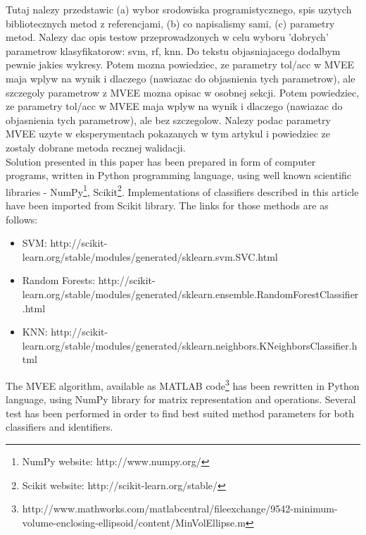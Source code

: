 \documentclass{llncs}
\begin{document}
{\color{red}Tutaj nalezy przedstawic (a) wybor srodowiska programistycznego, spis uzytych bibliotecznych metod z referencjami, (b) co napisalismy sami, (c) parametry metod. Nalezy dac opis testow przeprowadzonych w celu wyboru 'dobrych' parametrow klasyfikatorow: svm, rf, knn. Do tekstu objasniajacego dodalbym pewnie jakies wykresy. Potem mozna powiedziec, ze parametry tol/acc w MVEE maja wplyw na wynik i dlaczego (nawiazac do objasnienia tych parametrow), ale szczegoly parametrow z MVEE mozna opisac w osobnej sekcji.}
{\color{blue} Potem powiedziec, ze parametry tol/acc w MVEE maja wplyw na wynik i dlaczego (nawiazac do objasnienia tych parametrow), ale bez szczegolow. Nalezy podac parametry MVEE uzyte w eksperymentach pokazanych w tym artykul i powiedziec ze zostaly dobrane metoda recznej walidacji.}\\

Solution presented in this paper has been prepared in form of computer programs, written in Python programming language, using well known scientific libraries - NumPy\footnote{NumPy website: http://www.numpy.org/}, Scikit\footnote{Scikit website: http://scikit-learn.org/stable/}. Implementations of classifiers described in this article have been imported from Scikit library. The links for those methods are as follows:
\begin{itemize}
	\item SVM: http://scikit-learn.org/stable/modules/generated/sklearn.svm.SVC.html
	\item Random Forests: http://scikit-learn.org/stable/modules/generated/sklearn.ensemble.RandomForestClassifier.html
	\item KNN: http://scikit-learn.org/stable/modules/generated/sklearn.neighbors.KNeighborsClassifier.html
\end{itemize} 
The MVEE algorithm, available as MATLAB code\footnote{http://www.mathworks.com/matlabcentral/fileexchange/9542-minimum-volume-enclosing-ellipsoid/content/MinVolEllipse.m} has been rewritten in Python language, using NumPy library for matrix representation and operations. Several test has been performed in order to find best suited method parameters for both classifiers and identifiers. 
\end{document}
